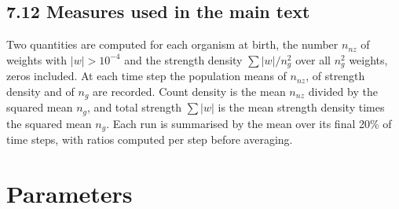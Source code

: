 \subsection*{7.12 Measures used in the main text}
Two quantities are computed for each organism at birth, the number $n_{nz}$ of weights with $|w|>10^{-4}$ and the strength density $\sum|w|/n_g^2$ over all $n_g^2$ weights, zeros included. At each time step the population means of $n_{nz}$, of strength density and of $n_g$ are recorded. Count density is the mean $n_{nz}$ divided by the squared mean $n_g$, and total strength $\sum|w|$ is the mean strength density times the squared mean $n_g$. Each run is summarised by the mean over its final 20\% of time
steps, with ratios computed per step before averaging.

\section*{Parameters}
